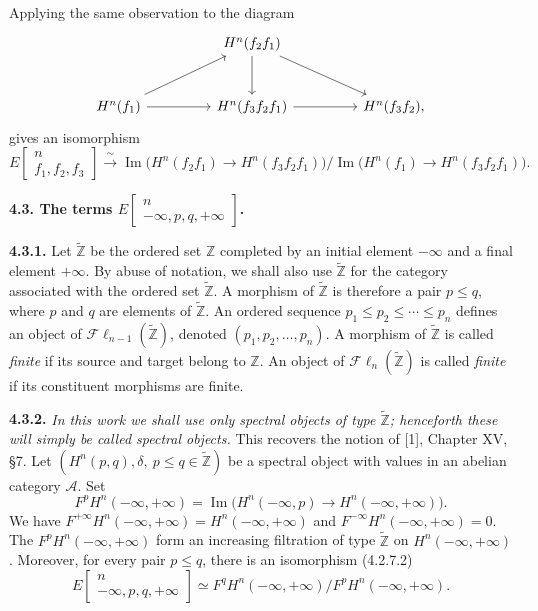 \clearpage
{}%
\begingroup\small\setlength{\parskip}{0pt}\setlength{\emergencystretch}{2.5em}
Applying the same observation to the diagram
\[
\begin{tikzcd}[column sep=4.6em,row sep=2.8em]
&H^n(f_2f_1)\arrow[d]\arrow[dr]&\\
H^n(f_1)\arrow[ur]\arrow[r]&
H^n(f_3f_2f_1)\arrow[r]&H^n(f_3f_2),
\end{tikzcd}
\]
gives an isomorphism
\[
E\!\begin{bmatrix}n\\ f_1,f_2,f_3\end{bmatrix}
\xrightarrow{\ \sim\ }
\operatorname{Im}\bigl(H^n(f_2f_1)\longrightarrow H^n(f_3f_2f_1)\bigr)
\Big/
\operatorname{Im}\bigl(H^n(f_1)\longrightarrow H^n(f_3f_2f_1)\bigr).
\tag{4.2.7.2}
\]

\medskip\noindent\textbf{4.3. The terms
$E\!\begin{bmatrix}n\\ -\infty,p,q,+\infty\end{bmatrix}$.}

\medskip\noindent\textbf{4.3.1.}
Let $\widetilde{\mathbb Z}$ be the ordered set $\mathbb Z$ completed by an
initial element $-\infty$ and a final element $+\infty$. By abuse of
notation, we shall also use $\widetilde{\mathbb Z}$ for the category
associated with the ordered set $\widetilde{\mathbb Z}$. A morphism of
$\widetilde{\mathbb Z}$ is therefore a pair $p\leq q$, where $p$ and $q$
are elements of $\widetilde{\mathbb Z}$. An ordered sequence
$p_1\leq p_2\leq\cdots\leq p_n$ defines an object of
$\mathcal{F}\ell_{n-1}(\widetilde{\mathbb Z})$, denoted
$(p_1,p_2,\ldots,p_n)$. A morphism of $\widetilde{\mathbb Z}$ is called
\textit{finite} if its source and target belong to $\mathbb Z$. An object
of $\mathcal{F}\ell_n(\widetilde{\mathbb Z})$ is called \textit{finite} if
its constituent morphisms are finite.

\medskip\noindent\textbf{4.3.2.}
\textit{In this work we shall use only spectral objects of type
$\widetilde{\mathbb Z}$; henceforth these will simply be called spectral
objects.} This recovers the notion of [1], Chapter XV, §7. Let
$(H^n(p,q),\delta,\ p\leq q\in\widetilde{\mathbb Z})$ be a spectral object
with values in an abelian category $\mathcal A$. Set
\[
F^pH^n(-\infty,+\infty)
=\operatorname{Im}\bigl(H^n(-\infty,p)\longrightarrow
H^n(-\infty,+\infty)\bigr).
\tag{4.3.2.1}
\]
We have $F^{+\infty}H^n(-\infty,+\infty)=H^n(-\infty,+\infty)$ and
$F^{-\infty}H^n(-\infty,+\infty)=0$. The
$F^pH^n(-\infty,+\infty)$ form an increasing filtration of type
$\widetilde{\mathbb Z}$ on $H^n(-\infty,+\infty)$. Moreover, for every pair
$p\leq q$, there is an isomorphism (4.2.7.2)
\[
E\!\begin{bmatrix}n\\ -\infty,p,q,+\infty\end{bmatrix}
\simeq
F^qH^n(-\infty,+\infty)\big/F^pH^n(-\infty,+\infty).
\]
\endgroup
